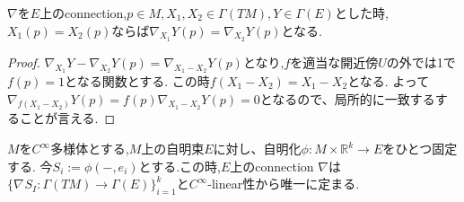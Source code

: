 \documentclass[dvipdfmx]{ujarticle}
\begin{document}
\begin{prop}
$\nabla$を$E$上のconnection,$p \in M, X_1,X_2 \in \Gamma(TM), Y \in \Gamma(E)$とした時,
$X_1(p) = X_2(p)$ならば$\nabla_{X_1}Y(p) = \nabla_{X_2}Y(p)$となる.
\end{prop}
\begin{proof}
$\nabla_{X_1}Y - \nabla_{X_2}Y(p) = \nabla_{X_1 - X_2}Y(p)$となり,$f$を適当な開近傍$U$の外では1で$f(p)=1$となる関数とする.
この時$f(X_1 - X_2) = X_1 - X_2$となる.
よって$\nabla_{f(X_1 - X_2)}Y(p) = f(p)\nabla_{X_1 - X_2}Y(p) = 0$となるので、局所的に一致するすることが言える.
\end{proof}

\begin{prop}
$M$を$C^{\infty}$多様体とする,$M$上の自明束$E$に対し、自明化$\phi:M \times \mathbb{R}^k \to E$をひとつ固定する.
今$S_i := \phi(-, e_i)$とする.この時,$E$上のconnection $\nabla$は
$\{ \nabla_{ }S_I: \Gamma(TM) \to \Gamma(E) \}_{i=1}^k$と$C^{\infty}$-linear性から唯一に定まる.
\end{prop}
\end{document}
